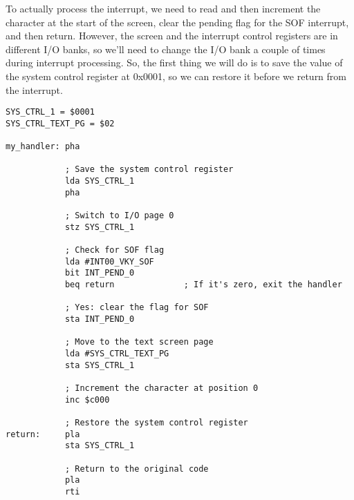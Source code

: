 To actually process the interrupt, we need to read and then increment the character at the start of the screen, clear the pending flag for the SOF interrupt, and then return. However, the screen and the interrupt control registers are in different I/O banks, so we'll need to change the I/O bank a couple of times during interrupt processing. So, the first thing we will do is to save the value of the system control register at 0x0001, so we can restore it before we return from the interrupt.

\begin{verbatim}
SYS_CTRL_1 = $0001
SYS_CTRL_TEXT_PG = $02

my_handler: pha

            ; Save the system control register
            lda SYS_CTRL_1
            pha

            ; Switch to I/O page 0
            stz SYS_CTRL_1

            ; Check for SOF flag
            lda #INT00_VKY_SOF
            bit INT_PEND_0
            beq return              ; If it's zero, exit the handler

            ; Yes: clear the flag for SOF
            sta INT_PEND_0

            ; Move to the text screen page
            lda #SYS_CTRL_TEXT_PG
            sta SYS_CTRL_1

            ; Increment the character at position 0
            inc $c000

            ; Restore the system control register
return:     pla
            sta SYS_CTRL_1

            ; Return to the original code
            pla
            rti
\end{verbatim}
